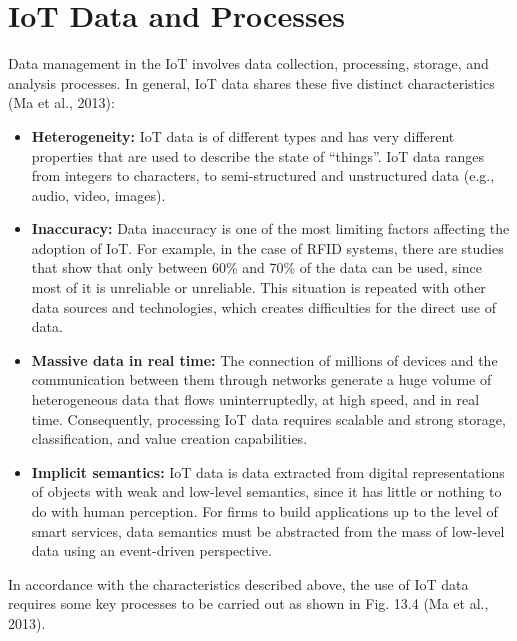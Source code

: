 \documentclass[
  letterpaper,
  DIV=11,
  numbers=noendperiod]{scrreprt}
\begin{document}
\hypertarget{iot-data-and-processes}{%
\section{IoT Data and Processes}\label{iot-data-and-processes}}

Data management in the IoT involves data collection, processing,
storage, and analysis processes. In general, IoT data shares these five
distinct characteristics (Ma et al., 2013):

\begin{itemize}
\item
  \textbf{Heterogeneity:} IoT data is of different types and has very
  different properties that are used to describe the state of
  ``things''. IoT data ranges from integers to characters, to
  semi-structured and unstructured data (e.g., audio, video, images).
\item
  \textbf{Inaccuracy:} Data inaccuracy is one of the most limiting
  factors affecting the adoption of IoT. For example, in the case of
  RFID systems, there are studies that show that only between 60\% and
  70\% of the data can be used, since most of it is unreliable or
  unreliable. This situation is repeated with other data sources and
  technologies, which creates difficulties for the direct use of data.
\item
  \textbf{Massive data in real time:} The connection of millions of
  devices and the communication between them through networks generate a
  huge volume of heterogeneous data that flows uninterruptedly, at high
  speed, and in real time. Consequently, processing IoT data requires
  scalable and strong storage, classification, and value creation
  capabilities.
\item
  \textbf{Implicit semantics:} IoT data is data extracted from digital
  representations of objects with weak and low-level semantics, since it
  has little or nothing to do with human perception. For firms to build
  applications up to the level of smart services, data semantics must be
  abstracted from the mass of low-level data using an event-driven
  perspective.
\end{itemize}

In accordance with the characteristics described above, the use of IoT
data requires some key processes to be carried out as shown in Fig. 13.4
(Ma et al., 2013).
\end{document}
